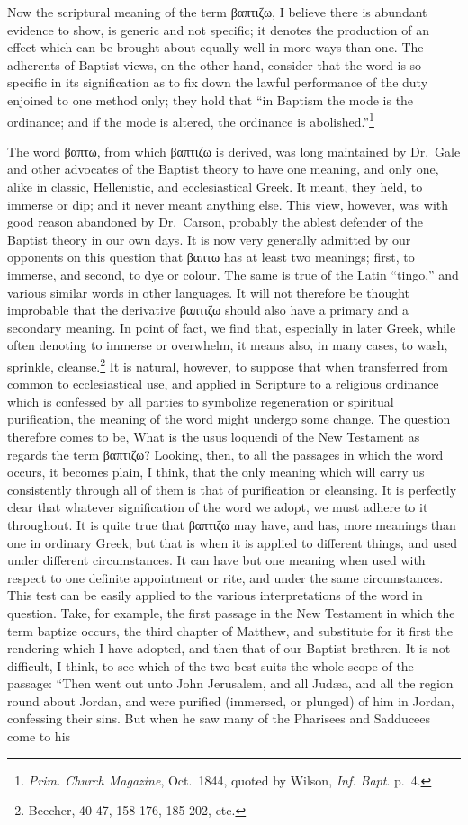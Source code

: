 \documentclass[]{book}
\begin{document}
Now the scriptural meaning of the term βαπτιζω, I believe there is abundant evidence to show, is generic and not specific; it denotes the production of an effect which can be brought about equally well in more ways than one. The adherents of Baptist views, on the other hand, consider that the word is so specific in its signification as to fix down the lawful performance of the duty enjoined to one method only; they hold that ``in Baptism the mode is the ordinance; and if the mode is altered, the ordinance is abolished.''\footnote{\emph{Prim. Church Magazine}, Oct.~1844, quoted by Wilson, \emph{Inf. Bapt}. p.~4.}

The word βαπτω, from which βαπτιζω is derived, was long maintained by Dr.~Gale and other advocates of the Baptist theory to have one meaning, and only one, alike in classic, Hellenistic, and ecclesiastical Greek. It meant, they held, to immerse or dip; and it never meant anything else. This view, however, was with good reason abandoned by Dr.~Carson, probably the ablest defender of the Baptist theory in our own days. It is now very generally admitted by our opponents on this question that βαπτω has at least two meanings; first, to immerse, and second, to dye or colour. The same is true of the Latin ``tingo,'' and various similar words in other languages. It will not therefore be thought improbable that the derivative βαπτιζω should also have a primary and a secondary meaning. In point of fact, we find that, especially in later Greek, while often denoting to immerse or overwhelm, it means also, in many cases, to wash, sprinkle, cleanse.\footnote{Beecher, 40-47, 158-176, 185-202, etc.} It is natural, however, to suppose that when transferred from common to ecclesiastical use, and applied in Scripture to a religious ordinance which is confessed by all parties to symbolize regeneration or spiritual purification, the meaning of the word might undergo some change. The question therefore comes to be, What is the usus loquendi of the New Testament as regards the term βαπτιζω? Looking, then, to all the passages in which the word occurs, it becomes plain, I think, that the only meaning which will carry us consistently through all of them is that of purification or cleansing. It is perfectly clear that whatever signification of the word we adopt, we must adhere to it throughout. It is quite true that βαπτιζω may have, and has, more meanings than one in ordinary Greek; but that is when it is applied to different things, and used under different circumstances. It can have but one meaning when used with respect to one definite appointment or rite, and under the same circumstances. This test can be easily applied to the various interpretations of the word in question. Take, for example, the first passage in the New Testament in which the term baptize occurs, the third chapter of Matthew, and substitute for it first the rendering which I have adopted, and then that of our Baptist brethren. It is not difficult, I think, to see which of the two best suits the whole scope of the passage: ``Then went out unto John Jerusalem, and all Judæa, and all the region round about Jordan, and were purified (immersed, or plunged) of him in Jordan, confessing their sins. But when he saw many of the Pharisees and Sadducees come to his 
\end{document}
